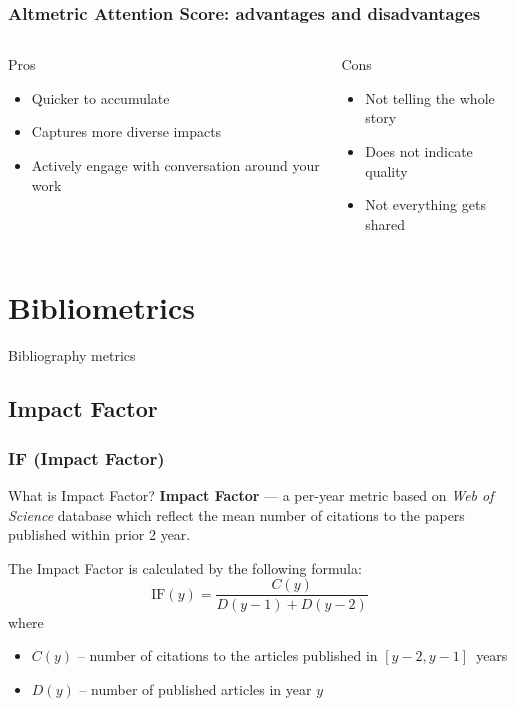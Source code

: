 \documentclass{beamer}
\newcommand{\pros}{\item[{\textcolor[HTML]{3C8031}{\ding{51}}}]}
\newcommand{\cons}{\item[\textcolor{red}{\ding{54}}]}
\newcommand{\wos}{\textit{Web of Science} }
\begin{document}
\begin{frame}
    \frametitle{Altmetric Attention Score: advantages and disadvantages}
    \begin{columns}[T]
        \begin{column}{.5\textwidth}
            \centering Pros
            \begin{itemize}[<+->]
                \pros Quicker to accumulate 
                \pros Captures more diverse impacts 
                \pros Actively engage with conversation around your work
            \end{itemize}
        \end{column}
        \begin{column}{.5\textwidth}
            \centering Cons
            \begin{itemize}[<+->]
                \cons Not telling the whole story
                \cons Does not indicate quality
                \cons Not everything gets shared
            \end{itemize}
        \end{column}
    \end{columns}
\end{frame}

\section{Bibliometrics}

\begin{frame}
    \centering
    \Huge
    Bibliography metrics
\end{frame}

\subsection{Impact Factor}
\begin{frame}
    \frametitle{IF (Impact Factor)}
    \begin{block}{What is Impact Factor?}
        \textbf{Impact Factor}\cite{garfield1972citation} --- a per-year
        metric based on \wos database which reflect the mean number of citations
        to the papers published within prior 2 year.
    \end{block}

    The Impact Factor is calculated by the following formula:
    \[
        \text{IF}(y) = \frac{C(y)}{D(y - 1) + D(y - 2)}
    \]
    where
    \begin{itemize}
        \item $C(y)$ -- number of citations to the articles published in $[y-2, y-1]$~years
        \item $D(y)$ -- number of published articles in year $y$
    \end{itemize}
\end{frame}
\end{document}

